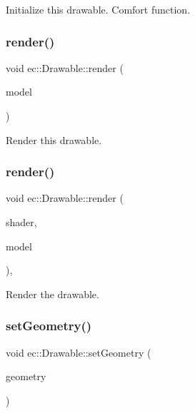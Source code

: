 Initialize this drawable. Comfort function. \mbox{\label{classec_1_1_drawable_ac9d3345bd308fce8c99adbfc12c53106}} 
\subsubsection{\texorpdfstring{render()}{render()}\hspace{0.1cm}{\footnotesize\ttfamily [1/2]}}
{\footnotesize\ttfamily void ec\+::\+Drawable\+::render (\begin{DoxyParamCaption}\item[{const glm\+::mat4 \&}]{model }\end{DoxyParamCaption})\hspace{0.3cm}{\ttfamily [virtual]}}

Render this drawable. \mbox{\label{classec_1_1_drawable_a328de693753d863f567e64f1ff6acfd4}} 
\subsubsection{\texorpdfstring{render()}{render()}\hspace{0.1cm}{\footnotesize\ttfamily [2/2]}}
{\footnotesize\ttfamily void ec\+::\+Drawable\+::render (\begin{DoxyParamCaption}\item[{\mbox{\hyperlink{classec_1_1_shader}{Shader}} $\ast$}]{shader,  }\item[{const glm\+::mat4 \&}]{model }\end{DoxyParamCaption})\hspace{0.3cm}{\ttfamily [protected]}, {\ttfamily [virtual]}}

Render the drawable. \mbox{\label{classec_1_1_drawable_a76bcb843ef5ced898724fa79a9b20250}} 
\subsubsection{\texorpdfstring{set\+Geometry()}{setGeometry()}}
{\footnotesize\ttfamily void ec\+::\+Drawable\+::set\+Geometry (\begin{DoxyParamCaption}\item[{\mbox{\hyperlink{classec_1_1_i_geometry_access}{I\+Geometry\+Access}} $\ast$}]{geometry }\end{DoxyParamCaption})}

